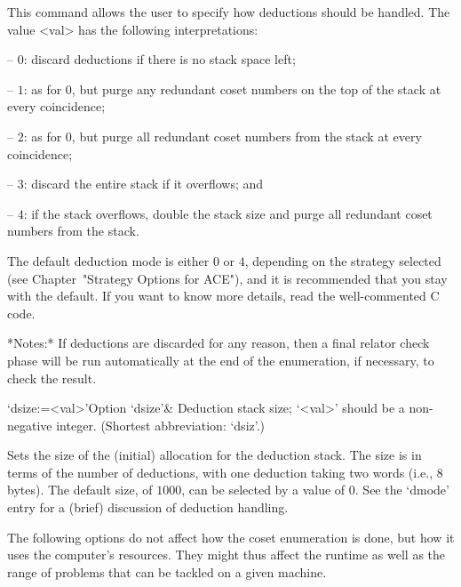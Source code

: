 This command allows the user  to  specify  how  deductions  should  be
handled. The value <val> has the following interpretations:

\beginlist

\item{--} $0$:  
discard deductions if there is no stack space left;

\item{--} $1$: 
as for $0$, but purge any redundant coset numbers on the  top  of  the
stack at every coincidence;

\item{--} $2$: 
as for 0, but purge all redundant coset  numbers  from  the  stack  at
every coincidence;

\item{--} $3$:
discard the entire stack if it overflows; and

\item{--} $4$:
if the stack overflows, double the stack size and purge all  redundant
coset numbers from the stack.

\endlist

The default deduction mode is either $0$  or  $4$,  depending  on  the
strategy selected (see Chapter~"Strategy Options for ACE"), and it  is
recommended that you stay with the default. If you want to  know  more
details, read the well-commented C code.

*Notes:*
If deductions are discarded for any reason, then a final relator check
phase  will be run  automatically at  the end  of the  enumeration, if
necessary, to check the result.

\>`dsize:=<val>'{Option `dsize'}&
Deduction stack size; `<val>' should be a non-negative integer.
(Shortest abbreviation: `dsiz'.)

Sets the  size of  the (initial) allocation  for the  deduction stack.
The size is  in terms of the number of  deductions, with one deduction
taking two words (i.e., 8 bytes).  The default size, of $1000$, can be
selected  by  a value  of  0.   See the  `dmode' entry  for a  (brief)
discussion of deduction handling.

\enditems


The following options do not affect how the coset enumeration is done,
but how it  uses the computer's resources. They  might thus affect the
runtime as  well as  the range of  problems that  can be tackled  on a
given machine.

